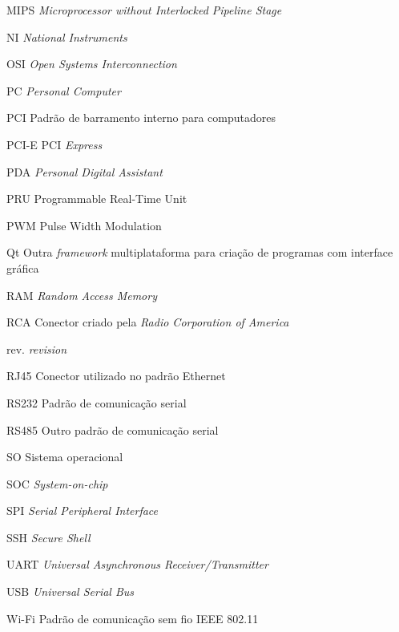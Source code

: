 \begin{siglas}
	\item[MIPS] \emph{Microprocessor without Interlocked Pipeline Stage}
	\item[NI] \emph{National Instruments}
	\item[OSI] \emph{Open Systems Interconnection}
	\item[PC] \emph{Personal Computer}
	\item[PCI] Padrão de barramento interno para computadores
	\item[PCI-E] PCI \emph{Express}
	\item[PDA] \emph{Personal Digital Assistant}
	\item[PRU] Programmable Real-Time Unit
	\item[PWM] Pulse Width Modulation
	\item[Qt] Outra \emph{framework} multiplataforma para criação de programas com interface gráfica
	\item[RAM] \emph{Random Access Memory}
	\item[RCA] Conector criado pela \emph{Radio Corporation of America}
	\item[rev.] \emph{revision}
	\item[RJ45] Conector utilizado no padrão Ethernet
	\item[RS232] Padrão de comunicação serial
	\item[RS485] Outro padrão de comunicação serial
	\item[SO] Sistema operacional
	\item[SOC] \emph{System-on-chip}
	\item[SPI] \emph{Serial Peripheral Interface}
	\item[SSH] \emph{Secure Shell}
	\item[UART] \emph{Universal Asynchronous Receiver/Transmitter}
	\item[USB] \emph{Universal Serial Bus}
	\item[Wi-Fi] Padrão de comunicação sem fio IEEE 802.11
\end{siglas}